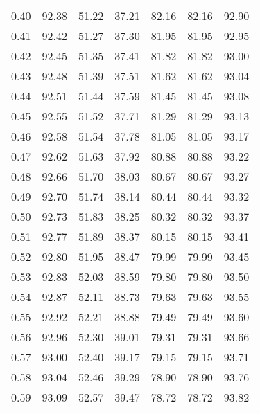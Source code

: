 \begin{tabular}{|c|c|c|c|c|c|c|}
      0.40 &     92.38 &     51.22 &      37.21 &   82.16 &      82.16 &         92.90 \\
      0.41 &     92.42 &     51.27 &      37.30 &   81.95 &      81.95 &         92.95 \\
      0.42 &     92.45 &     51.35 &      37.41 &   81.82 &      81.82 &         93.00 \\
      0.43 &     92.48 &     51.39 &      37.51 &   81.62 &      81.62 &         93.04 \\
      0.44 &     92.51 &     51.44 &      37.59 &   81.45 &      81.45 &         93.08 \\
      0.45 &     92.55 &     51.52 &      37.71 &   81.29 &      81.29 &         93.13 \\
      0.46 &     92.58 &     51.54 &      37.78 &   81.05 &      81.05 &         93.17 \\
      0.47 &     92.62 &     51.63 &      37.92 &   80.88 &      80.88 &         93.22 \\
      0.48 &     92.66 &     51.70 &      38.03 &   80.67 &      80.67 &         93.27 \\
      0.49 &     92.70 &     51.74 &      38.14 &   80.44 &      80.44 &         93.32 \\
      0.50 &     92.73 &     51.83 &      38.25 &   80.32 &      80.32 &         93.37 \\
      0.51 &     92.77 &     51.89 &      38.37 &   80.15 &      80.15 &         93.41 \\
      0.52 &     92.80 &     51.95 &      38.47 &   79.99 &      79.99 &         93.45 \\
      0.53 &     92.83 &     52.03 &      38.59 &   79.80 &      79.80 &         93.50 \\
      0.54 &     92.87 &     52.11 &      38.73 &   79.63 &      79.63 &         93.55 \\
      0.55 &     92.92 &     52.21 &      38.88 &   79.49 &      79.49 &         93.60 \\
      0.56 &     92.96 &     52.30 &      39.01 &   79.31 &      79.31 &         93.66 \\
      0.57 &     93.00 &     52.40 &      39.17 &   79.15 &      79.15 &         93.71 \\
      0.58 &     93.04 &     52.46 &      39.29 &   78.90 &      78.90 &         93.76 \\
      0.59 &     93.09 &     52.57 &      39.47 &   78.72 &      78.72 &         93.82 \\

\end{tabular}
